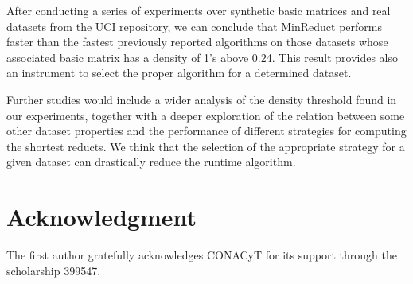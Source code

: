 \documentclass[authoryear,preprint,review,12pt]{elsarticle}
\begin{document}
	After conducting a series of experiments over synthetic basic matrices and real datasets from the UCI repository, we can conclude that MinReduct performs faster than the fastest previously reported algorithms on those datasets whose associated basic matrix has a density of 1's above 0.24. This result provides also an instrument to select the proper algorithm for a determined dataset. 
	
	Further studies would include a wider analysis of the density threshold found in our experiments, together with a deeper exploration of the relation between some other dataset properties and the performance of different strategies for computing the shortest reducts. We think that the selection of the appropriate strategy for a given dataset can drastically reduce the runtime algorithm.

\section{Acknowledgment}
	The first author gratefully acknowledges CONACyT for its support through the scholarship 399547.
\newpage 
{}

\end{document}
